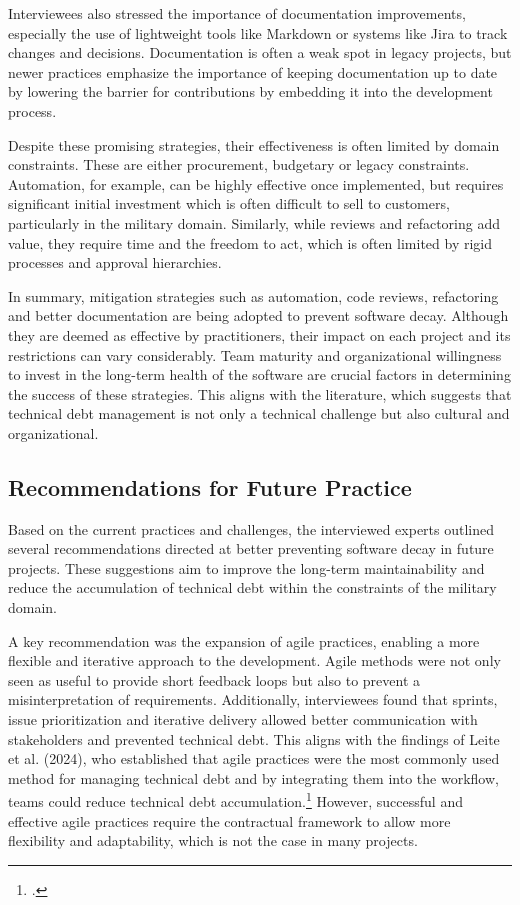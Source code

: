Interviewees also stressed the importance of documentation improvements, especially the use of lightweight tools like Markdown or systems like Jira to track changes and decisions. Documentation is often a weak spot in legacy projects, but newer practices 
emphasize the importance of keeping documentation up to date by lowering the barrier for contributions by embedding it into the development process.

Despite these promising strategies, their effectiveness is often limited by domain constraints. These are either procurement, budgetary or legacy constraints. Automation, for example, can be highly effective once implemented, but requires significant initial investment which is often difficult to sell to customers, particularly in the military domain.
Similarly, while reviews and refactoring add value, they require time and the freedom to act, which is often limited by rigid processes and approval hierarchies.

In summary, mitigation strategies such as automation, code reviews, refactoring and better documentation are being adopted to prevent software decay. Although they are deemed as effective by practitioners, their impact on each project and its restrictions can vary considerably. Team maturity and organizational
willingness to invest in the long-term health of the software are crucial factors in determining the success of these strategies. This aligns with the literature, which suggests that technical debt management is not only a technical challenge but also cultural and organizational.

\subsection{Recommendations for Future Practice}
Based on the current practices and challenges, the interviewed experts outlined several recommendations directed at better preventing software decay in future projects. These suggestions aim to improve the long-term maintainability
and reduce the accumulation of technical debt within the constraints of the military domain.

A key recommendation was the expansion of agile practices, enabling a more flexible and iterative approach to the development. Agile methods were not only seen as useful to provide short feedback loops but also to prevent a misinterpretation of requirements.
Additionally, interviewees found that sprints, issue prioritization and iterative delivery allowed better communication with stakeholders and prevented technical debt.
This aligns with the findings of Leite et al. (2024), who established that agile practices were the most commonly used method for managing technical debt and by integrating them into the workflow, teams could reduce technical debt accumulation.\footcite[318]{leiteTechnicalDebtManagement2024}
However, successful and effective agile practices require the contractual framework to allow more flexibility and adaptability, which is not the case in many projects.

